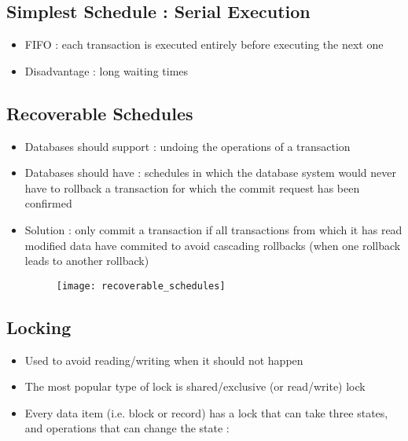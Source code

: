 \subsection{Simplest Schedule : Serial Execution}

\begin{itemize}
    \item FIFO : each transaction is executed entirely before executing the next one
    \item Disadvantage : long waiting times
\end{itemize}

\subsection{Recoverable Schedules}

\begin{itemize}
    \item Databases should support  : undoing the operations of a transaction
    \item Databases should have  : schedules in which the database system would never have to rollback a transaction for which the commit request has been confirmed
    \item Solution : only commit a transaction if all transactions from which it has read modified data have commited to avoid cascading rollbacks (when one rollback leads to another rollback)
    \begin{figure}[H]
        \centering
        \texttt{[image: recoverable\_schedules]}
    \end{figure}
\end{itemize}

\subsection{Locking}

\begin{itemize}
    \item Used to avoid reading/writing when it should not happen
    \item The most popular type of lock is shared/exclusive (or read/write) lock
    \item Every data item (i.e. block or record) has a lock that can take three states, and operations that can change the state :
\end{itemize}

